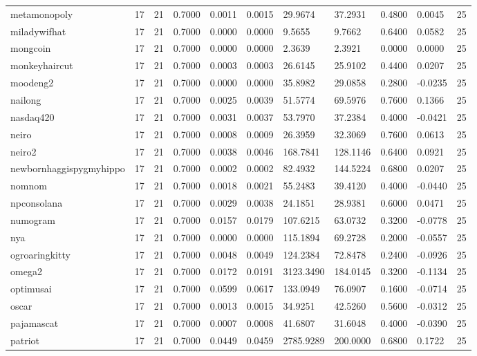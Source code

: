 \begin{table}[htbp]
\begin{tabular}{lllllllllll}
metamonopoly & 17 & 21 & 0.7000 & 0.0011 & 0.0015 & 29.9674 & 37.2931 & 0.4800 & 0.0045 & 25 \\
miladywifhat & 17 & 21 & 0.7000 & 0.0000 & 0.0000 & 9.5655 & 9.7662 & 0.6400 & 0.0582 & 25 \\
mongcoin & 17 & 21 & 0.7000 & 0.0000 & 0.0000 & 2.3639 & 2.3921 & 0.0000 & 0.0000 & 25 \\
monkeyhaircut & 17 & 21 & 0.7000 & 0.0003 & 0.0003 & 26.6145 & 25.9102 & 0.4400 & 0.0207 & 25 \\
moodeng2 & 17 & 21 & 0.7000 & 0.0000 & 0.0000 & 35.8982 & 29.0858 & 0.2800 & -0.0235 & 25 \\
nailong & 17 & 21 & 0.7000 & 0.0025 & 0.0039 & 51.5774 & 69.5976 & 0.7600 & 0.1366 & 25 \\
nasdaq420 & 17 & 21 & 0.7000 & 0.0031 & 0.0037 & 53.7970 & 37.2384 & 0.4000 & -0.0421 & 25 \\
neiro & 17 & 21 & 0.7000 & 0.0008 & 0.0009 & 26.3959 & 32.3069 & 0.7600 & 0.0613 & 25 \\
neiro2 & 17 & 21 & 0.7000 & 0.0038 & 0.0046 & 168.7841 & 128.1146 & 0.6400 & 0.0921 & 25 \\
newbornhaggispygmyhippo & 17 & 21 & 0.7000 & 0.0002 & 0.0002 & 82.4932 & 144.5224 & 0.6800 & 0.0207 & 25 \\
nomnom & 17 & 21 & 0.7000 & 0.0018 & 0.0021 & 55.2483 & 39.4120 & 0.4000 & -0.0440 & 25 \\
npconsolana & 17 & 21 & 0.7000 & 0.0029 & 0.0038 & 24.1851 & 28.9381 & 0.6000 & 0.0471 & 25 \\
numogram & 17 & 21 & 0.7000 & 0.0157 & 0.0179 & 107.6215 & 63.0732 & 0.3200 & -0.0778 & 25 \\
nya & 17 & 21 & 0.7000 & 0.0000 & 0.0000 & 115.1894 & 69.2728 & 0.2000 & -0.0557 & 25 \\
ogroaringkitty & 17 & 21 & 0.7000 & 0.0048 & 0.0049 & 124.2384 & 72.8478 & 0.2400 & -0.0926 & 25 \\
omega2 & 17 & 21 & 0.7000 & 0.0172 & 0.0191 & 3123.3490 & 184.0145 & 0.3200 & -0.1134 & 25 \\
optimusai & 17 & 21 & 0.7000 & 0.0599 & 0.0617 & 133.0949 & 76.0907 & 0.1600 & -0.0714 & 25 \\
oscar & 17 & 21 & 0.7000 & 0.0013 & 0.0015 & 34.9251 & 42.5260 & 0.5600 & -0.0312 & 25 \\
pajamascat & 17 & 21 & 0.7000 & 0.0007 & 0.0008 & 41.6807 & 31.6048 & 0.4000 & -0.0390 & 25 \\
patriot & 17 & 21 & 0.7000 & 0.0449 & 0.0459 & 2785.9289 & 200.0000 & 0.6800 & 0.1722 & 25 \\

\end{tabular}
\end{table}
